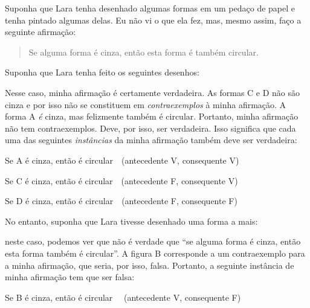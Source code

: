 Suponha que Lara tenha desenhado algumas formas em um pedaço de papel e tenha pintado algumas delas.
Eu não vi o que ela fez, mas, mesmo assim, faço a seguinte afirmação:
	\begin{quote}
		Se alguma forma é cinza, então esta forma é também circular.
	\end{quote}
Suponha que Lara tenha feito os seguintes desenhos:
\begin{center}
\end{center}
Nesse caso, minha afirmação é certamente verdadeira.
As formas C e D não são cinza e por isso não se constituem em \emph{contraexemplos} à minha afirmação.
A forma A \emph{é} cinza, mas felizmente também é circular.
Portanto, minha afirmação não tem contraexemplos.
Deve, por isso, ser verdadeira.
Isso significa que cada uma das seguintes \emph{instâncias} da minha afirmação também deve ser verdadeira:
{\small 
	\begin{ebullet}
		\item Se A é cinza, então é circular\ \ \hfill (antecedente V, consequente V)
		\item Se C é cinza, então é circular\ \ \hfill (antecedente F, consequente V)
		\item Se D é cinza, então é circular\  \ \hfill (antecedente F, consequente F)
	\end{ebullet}}
No entanto, suponha que Lara tivesse desenhado uma forma a mais:
\begin{center}
\end{center}
neste caso, podemos ver que não é verdade que ``se alguma forma é cinza, então esta forma também é circular''.
A figura B corresponde a um contraexemplo para a minha afirmação, que seria, por isso, falsa.
Portanto, a seguinte instância de minha afirmação tem que ser  falsa:
{\small
	\begin{ebullet}
		\item Se B é cinza, então é circular \ \ \hfill (antecedente V, consequente F)
	\end{ebullet}}
